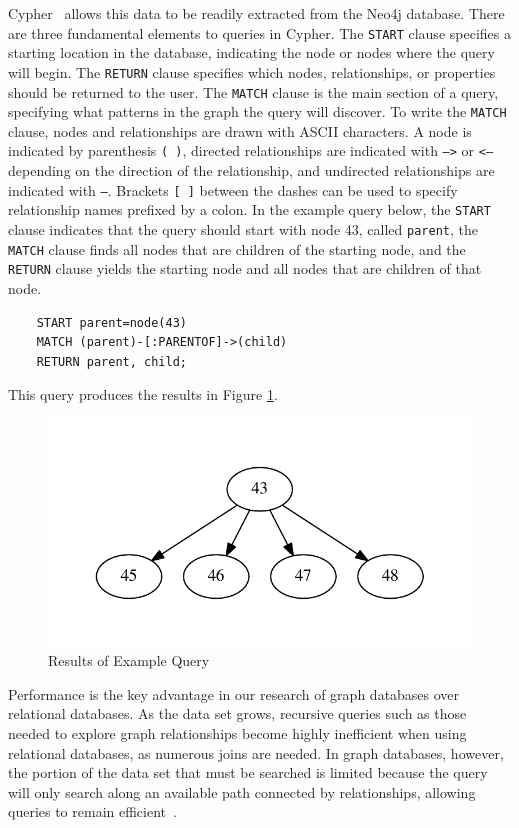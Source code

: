 \documentclass[12pt]{article}
\begin{document}
Cypher~\cite{GraphDatabases:2013} allows this data to be readily extracted from the Neo4j database. There are three fundamental elements to queries in Cypher. The \texttt{START} clause specifies a starting location in the database, indicating the node or nodes where the query will begin. The \texttt{RETURN} clause specifies which nodes, relationships, or properties should be returned to the user. The \texttt{MATCH} clause is the main section of a query, specifying what patterns in the graph the query will discover. To write the \texttt{MATCH} clause, nodes and relationships are drawn with ASCII characters. A node is indicated by parenthesis \texttt{( )}, directed relationships are indicated with \texttt{-->} or \texttt{<--} depending on the direction of the relationship, and undirected relationships are indicated with \texttt{--}. Brackets \texttt{[ ]} between the dashes can be used to specify relationship names prefixed by a colon. In the example query below, the \texttt{START} clause indicates that the query should start with node 43, called \texttt{parent}, the \texttt{MATCH} clause finds all nodes that are children of the starting node, and the \texttt{RETURN} clause yields the starting node and all nodes that are children of that node.

\begin{verbatim}
    START parent=node(43)
    MATCH (parent)-[:PARENTOF]->(child)
    RETURN parent, child;
\end{verbatim}

This query produces the results in Figure \ref{fig:exampleQuery}.
\begin{figure}[tb]
 \centering
 \includegraphics[height=0.30 \textwidth]{parents}
 \caption{Results of Example Query}
 \label{fig:exampleQuery}
\end{figure}

Performance is the key advantage in our research of graph databases over relational databases. As the data set grows, recursive queries such as those needed to explore graph relationships become highly inefficient when using relational databases, as numerous joins are needed. In graph databases, however, the portion of the data set that must be searched is limited because the query will only search along an available path connected by relationships, allowing queries to remain efficient~\cite{GraphDatabases:2013}.
\end{document}
